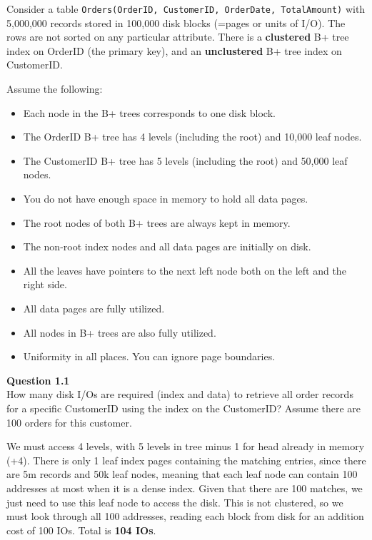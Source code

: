 \documentclass{article}
\begin{document}
    \begin{example}
      Consider a table \texttt{Orders(OrderID, CustomerID, OrderDate, TotalAmount)} with 5,000,000 records stored in 100,000 disk blocks (=pages or units of I/O). The rows are not sorted on any particular attribute. There is a \textbf{clustered} B+ tree index on OrderID (the primary key), and an \textbf{unclustered} B+ tree index on CustomerID.

      Assume the following:
      \begin{itemize}
        \item Each node in the B+ trees corresponds to one disk block.
        \item The OrderID B+ tree has 4 levels (including the root) and 10,000 leaf nodes.
        \item The CustomerID B+ tree has 5 levels (including the root) and 50,000 leaf nodes.
        \item You do not have enough space in memory to hold all data pages.
        \item The root nodes of both B+ trees are always kept in memory.
        \item The non-root index nodes and all data pages are initially on disk.
        \item All the leaves have pointers to the next left node both on the left and the right side.
        \item All data pages are fully utilized.
        \item All nodes in B+ trees are also fully utilized.
        \item Uniformity in all places. You can ignore page boundaries.
      \end{itemize}

      \noindent\textbf{Question 1.1}\\
      How many disk I/Os are required (index and data) to retrieve all order records for a specific CustomerID using the index on the CustomerID? Assume there are 100 orders for this customer.

      We must access 4 levels, with 5 levels in tree minus 1 for head already in memory (+4). There is only 1 leaf index pages containing the matching entries, since there are 5m records and 50k leaf nodes, meaning that each leaf node can contain 100 addresses at most when it is a dense index. Given that there are 100 matches, we just need to use this leaf node to access the disk. This is not clustered, so we must look through all 100 addresses, reading each block from disk for an addition cost of 100 IOs. Total is \textbf{104 IOs}. 


\end{example}
\end{document}

